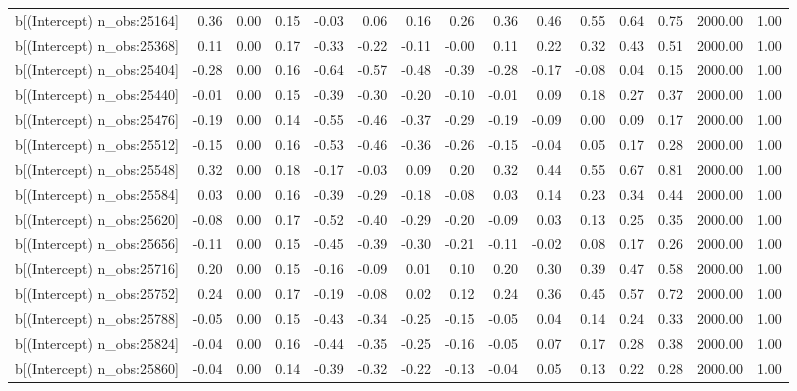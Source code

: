 \begin{table}[ht]
\begin{tabular}{rrrrrrrrrrrrrrr}
  b[(Intercept) n\_obs:25164] & 0.36 & 0.00 & 0.15 & -0.03 & 0.06 & 0.16 & 0.26 & 0.36 & 0.46 & 0.55 & 0.64 & 0.75 & 2000.00 & 1.00 \\ 
  b[(Intercept) n\_obs:25368] & 0.11 & 0.00 & 0.17 & -0.33 & -0.22 & -0.11 & -0.00 & 0.11 & 0.22 & 0.32 & 0.43 & 0.51 & 2000.00 & 1.00 \\ 
  b[(Intercept) n\_obs:25404] & -0.28 & 0.00 & 0.16 & -0.64 & -0.57 & -0.48 & -0.39 & -0.28 & -0.17 & -0.08 & 0.04 & 0.15 & 2000.00 & 1.00 \\ 
  b[(Intercept) n\_obs:25440] & -0.01 & 0.00 & 0.15 & -0.39 & -0.30 & -0.20 & -0.10 & -0.01 & 0.09 & 0.18 & 0.27 & 0.37 & 2000.00 & 1.00 \\ 
  b[(Intercept) n\_obs:25476] & -0.19 & 0.00 & 0.14 & -0.55 & -0.46 & -0.37 & -0.29 & -0.19 & -0.09 & 0.00 & 0.09 & 0.17 & 2000.00 & 1.00 \\ 
  b[(Intercept) n\_obs:25512] & -0.15 & 0.00 & 0.16 & -0.53 & -0.46 & -0.36 & -0.26 & -0.15 & -0.04 & 0.05 & 0.17 & 0.28 & 2000.00 & 1.00 \\ 
  b[(Intercept) n\_obs:25548] & 0.32 & 0.00 & 0.18 & -0.17 & -0.03 & 0.09 & 0.20 & 0.32 & 0.44 & 0.55 & 0.67 & 0.81 & 2000.00 & 1.00 \\ 
  b[(Intercept) n\_obs:25584] & 0.03 & 0.00 & 0.16 & -0.39 & -0.29 & -0.18 & -0.08 & 0.03 & 0.14 & 0.23 & 0.34 & 0.44 & 2000.00 & 1.00 \\ 
  b[(Intercept) n\_obs:25620] & -0.08 & 0.00 & 0.17 & -0.52 & -0.40 & -0.29 & -0.20 & -0.09 & 0.03 & 0.13 & 0.25 & 0.35 & 2000.00 & 1.00 \\ 
  b[(Intercept) n\_obs:25656] & -0.11 & 0.00 & 0.15 & -0.45 & -0.39 & -0.30 & -0.21 & -0.11 & -0.02 & 0.08 & 0.17 & 0.26 & 2000.00 & 1.00 \\ 
  b[(Intercept) n\_obs:25716] & 0.20 & 0.00 & 0.15 & -0.16 & -0.09 & 0.01 & 0.10 & 0.20 & 0.30 & 0.39 & 0.47 & 0.58 & 2000.00 & 1.00 \\ 
  b[(Intercept) n\_obs:25752] & 0.24 & 0.00 & 0.17 & -0.19 & -0.08 & 0.02 & 0.12 & 0.24 & 0.36 & 0.45 & 0.57 & 0.72 & 2000.00 & 1.00 \\ 
  b[(Intercept) n\_obs:25788] & -0.05 & 0.00 & 0.15 & -0.43 & -0.34 & -0.25 & -0.15 & -0.05 & 0.04 & 0.14 & 0.24 & 0.33 & 2000.00 & 1.00 \\ 
  b[(Intercept) n\_obs:25824] & -0.04 & 0.00 & 0.16 & -0.44 & -0.35 & -0.25 & -0.16 & -0.05 & 0.07 & 0.17 & 0.28 & 0.38 & 2000.00 & 1.00 \\ 
  b[(Intercept) n\_obs:25860] & -0.04 & 0.00 & 0.14 & -0.39 & -0.32 & -0.22 & -0.13 & -0.04 & 0.05 & 0.13 & 0.22 & 0.28 & 2000.00 & 1.00 \\ 

\end{tabular}
\end{table}
